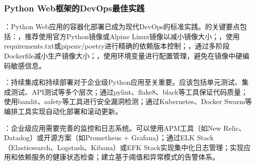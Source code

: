 \hypertarget{python-webux6846ux67b6ux7684devopsux6700ux4f73ux5b9eux8df5}{%
\subsubsection{Python Web框架的DevOps最佳实践}\label{python-webux6846ux67b6ux7684devopsux6700ux4f73ux5b9eux8df5}}

：Python Web应用的容器化部署已成为现代DevOps的标准实践。的关键要点包括：，推荐使用官方Python镜像或Alpine Linux镜像以减小镜像大小；，使用requirements.txt或pipenv/poetry进行精确的依赖版本控制；，通过多阶段Dockerfile减小生产镜像大小；，使用环境变量进行配置管理，避免在镜像中硬编码敏感信息。

：持续集成和持续部署对于企业级Python应用至关重要。应该包括单元测试、集成测试、API测试等多个层次；通过pylint、flake8、black等工具保证代码质量；使用bandit、safety等工具进行安全漏洞检测；通过Kubernetes、Docker Swarm等编排工具实现自动化部署和滚动更新。

：企业级应用需要完善的监控和日志系统。可以使用APM工具（如New Relic、Datadog）或开源方案（如Prometheus + Grafana）；通过ELK Stack（Elasticsearch、Logstash、Kibana）或EFK Stack实现集中化日志管理；实现应用和依赖服务的健康状态检查；建立基于阈值和异常模式的告警体系。

